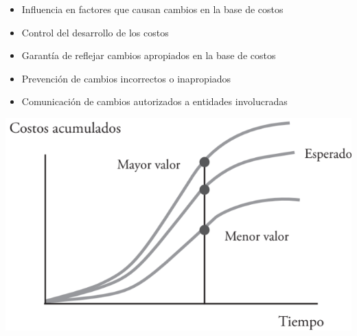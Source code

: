 \documentclass{article} %
\begin{document}
\begin{minipage}{0.45\textwidth}
    \begin{itemize}[label={},left=0pt,align=parleft]
        \item \begin{highlightbox}[levelone] Influencia en factores que causan cambios en la base de costos \end{highlightbox}
        \item \begin{highlightbox}[levelone] Control del desarrollo de los costos \end{highlightbox}
        \item \begin{highlightbox}[levelone] Garantía de reflejar cambios apropiados en la base de costos \end{highlightbox}
        \item \begin{highlightbox}[levelone] Prevención de cambios incorrectos o inapropiados \end{highlightbox}
        \item \begin{highlightbox}[levelone] Comunicación de cambios autorizados a entidades involucradas \end{highlightbox}
    \end{itemize}
\end{minipage}
\hfill
\begin{minipage}{0.5\textwidth}
    \centering
    \includegraphics[width=\textwidth]{curva_s.png}
\end{minipage}
\end{document}
